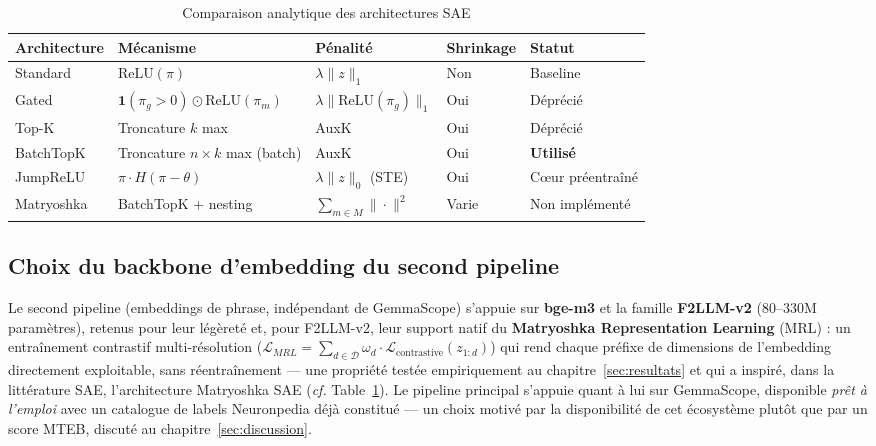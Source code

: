 \documentclass[11pt]{article}
\newcommand{\ind}{\mathbf{1}}
\begin{document}
\begin{table}[h!]
\centering
\caption{Comparaison analytique des architectures SAE}
\label{tab:sae-archs}
\vspace{0.5em}\small
\begin{tabular}{@{}lllll@{}}
\toprule
\textbf{Architecture} & \textbf{Mécanisme} & \textbf{Pénalité}
  & \textbf{Shrinkage} & \textbf{Statut} \\ \midrule
Standard  & $\text{ReLU}(\pi)$                          & $\lambda\|z\|_1$          & Non  & Baseline \\
Gated     & $\ind(\pi_g>0) \odot \text{ReLU}(\pi_m)$   & $\lambda\|\text{ReLU}(\pi_g)\|_1$ & Oui & Déprécié\\
Top-K     & Troncature $k$ max                          & AuxK                      & Oui  & Déprécié \\
BatchTopK & Troncature $n{\times}k$ max (batch)         & AuxK                      & Oui  & \textbf{Utilisé} \\
JumpReLU  & $\pi \cdot H(\pi - \theta)$                 & $\lambda\|z\|_0$ (STE)    & Oui  & Cœur préentraîné \\
Matryoshka & BatchTopK + nesting                        & $\sum_{m\in M}\|\cdot\|^2$ & Varie & Non implémenté \\ \bottomrule
\end{tabular}
\end{table}

\subsection{Choix du backbone d'embedding du second pipeline}

Le second pipeline (embeddings de phrase, indépendant de GemmaScope) s'appuie
sur \textbf{bge-m3} et la famille \textbf{F2LLM-v2} (80--330M paramètres),
retenus pour leur légèreté et, pour F2LLM-v2, leur support natif du
\textbf{Matryoshka Representation Learning} (MRL) \cite{kusupati2022mrl} : un
entraînement contrastif multi-résolution
($\mathcal{L}_{MRL} = \sum_{d \in \mathcal{D}} \omega_d \cdot
\mathcal{L}_\text{contrastive}(z_{1:d})$) qui rend chaque préfixe de
dimensions de l'embedding directement exploitable, sans réentraînement --- une
propriété testée empiriquement au chapitre~\ref{sec:resultats} et qui a
inspiré, dans la littérature SAE, l'architecture Matryoshka SAE (\emph{cf.}
Table~\ref{tab:sae-archs}). Le pipeline principal s'appuie quant à lui sur
GemmaScope, disponible \emph{prêt à l'emploi} avec un catalogue de labels
Neuronpedia déjà constitué --- un choix motivé par la disponibilité de cet
écosystème plutôt que par un score MTEB, discuté au
chapitre~\ref{sec:discussion}.
\end{document}
